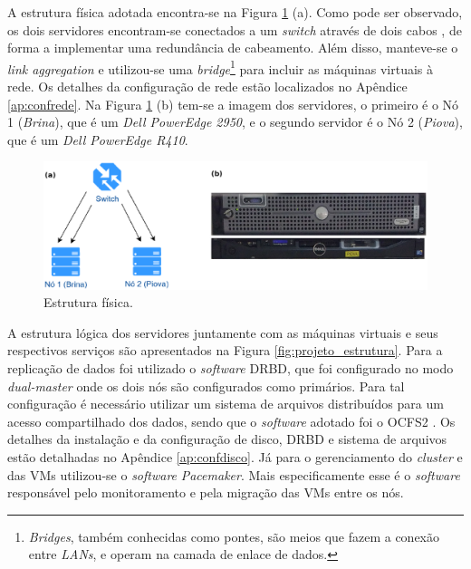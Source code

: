 A estrutura física adotada encontra-se na Figura \ref{fig:projeto_fisico} (a). Como pode ser observado, os dois servidores encontram-se 
conectados a um \textit{switch} através de dois cabos , de forma a implementar uma redundância de cabeamento. Além disso, manteve-se o 
\textit{link aggregation} e utilizou-se uma \textit{bridge}\footnote[1]{\textit{Bridges}, também conhecidas como pontes, são meios que fazem a 
conexão entre \textit{LANs}, e operam na camada de enlace de dados.} para incluir as máquinas virtuais à rede. 
Os detalhes da configuração de rede estão localizados no Apêndice \ref{ap:confrede}.
Na Figura \ref{fig:projeto_fisico} (b) tem-se a imagem dos servidores, o primeiro é o Nó 1 (\textit{Brina}), que é um 
\textit{Dell PowerEdge 2950}, e o segundo servidor é o Nó 2 (\textit{Piova}), que é um \textit{Dell PowerEdge R410}.

\begin{figure}[h!]
 \centering
 \includegraphics[width=430px]{img/projeto_fisico.eps}
 \caption{Estrutura física.}
 \label{fig:projeto_fisico}
\end{figure}

A estrutura lógica dos servidores juntamente com as máquinas virtuais e seus respectivos serviços são apresentados na Figura 
\ref{fig:projeto_estrutura}. Para a replicação de dados foi utilizado o \textit{software} \ac{DRBD}, que foi configurado no modo 
\textit{dual-master} onde os dois nós são configurados como primários. Para tal configuração é necessário utilizar um sistema de arquivos 
distribuídos para um acesso compartilhado dos dados, sendo que o \textit{software} adotado foi o \ac{OCFS2} \cite{ocfs2}. 
Os detalhes da instalação e da configuração de disco, \ac{DRBD} e sistema de arquivos estão detalhadas no Apêndice \ref{ap:confdisco}. 
Já para o gerenciamento do \textit{cluster} e das \acp{VM} utilizou-se o \textit{software} \textit{Pacemaker}. 
Mais especificamente esse é o \textit{software} responsável pelo monitoramento e pela migração das \acp{VM} entre os nós.

